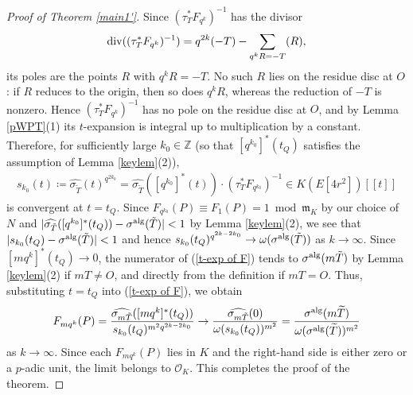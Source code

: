 \documentclass[11pt]{amsart}
\theoremstyle{definition}
\begin{document}
\begin{proof}[Proof of Theorem \ref{main1'}]
Since $(\tau_T^\ast F_{q^k})^{-1}$ has the divisor
%
\begin{align*}
{\rm div}((\tau_T^\ast F_{q^k})^{-1})=q^{2k}(-T)-\sum_{q^{k}R=-T}(R),
\end{align*}
%
its poles are the points $R$ with $q^kR=-T$. No such $R$ lies on the
residue disc at $O$: if $R$ reduces to the origin, then so does $q^kR$,
whereas the reduction of $-T$ is nonzero. Hence
$(\tau_T^\ast F_{q^k})^{-1}$ has no pole on the residue disc at $O$, and
by Lemma \ref{pWPT}(1) its $t$-expansion is integral up to multiplication
by a constant.
Therefore, for sufficiently large $k_0 \in \mathbb{Z}$ (so that $[q^{k_0}]^{\ast}(t_Q)$ satisfies the assumption of Lemma \ref{keylem}(2)),
%
\begin{align*}
s_{k_0}(t) \coloneqq \widehat{\sigma_{\tilde{T}}}(t)^{q^{2k_0}}=\widehat{\sigma_{\tilde{T}}}([q^{k_0}]^{\ast}(t)) \cdot (\tau_T^\ast F_{q^{k_0}})^{-1} \in K(E[4r^2])[[t]]
\end{align*}
%
is convergent at $t=t_Q$. Since $F_{q^{k_0}}(P) \equiv F_1(P) =1 \bmod \mathfrak{m}_K$ by our choice of $N$ and $|\widehat{\sigma_{\tilde{T}}}([q^{k_0}]^{\ast}(t_Q))-\sigma^{\rm alg}(\tilde{T})|<1$ by Lemma \ref{keylem}(2), we see that $|s_{k_0}(t_Q)-\sigma^{\rm alg}(\tilde{T})|<1$ and hence $s_{k_0}(t_Q)^{q^{2k-2k_0}} \to \omega(\sigma^{\rm alg}(\tilde{T}))$ as $k \to \infty$. Since $[mq^k]^{\ast}(t_Q) \to 0$, the numerator of (\ref{t-exp of F}) tends to $\sigma^{\rm alg}(m\tilde{T})$ by Lemma \ref{keylem}(2) if $mT \neq O$, and directly from the definition if $mT=O$. Thus, substituting $t=t_Q$ into (\ref{t-exp of F}), we obtain
%
\begin{align*}
F_{mq^k}(P)
=\frac{\widehat{\sigma_{m\tilde{T}}}([mq^k]^{\ast}(t_Q))}{s_{k_0}(t_Q)^{m^2q^{2k-2k_0}}}
\to \frac{\widehat{\sigma_{m\tilde{T}}}(0)}{\omega(s_{k_0}(t_Q))^{m^2}}= \frac{\sigma^{\rm alg}(m\widetilde{T})}{\omega(\sigma^{\rm alg}(\widetilde{T}))^{m^2}}
\end{align*}
%
as $k \to \infty$. Since each $F_{mq^k}(P)$ lies in $K$ and the right-hand side is either zero or a $p$-adic unit, the limit belongs to $\mathcal{O}_K$. This completes the proof of the theorem.
\end{proof}
\end{document}
